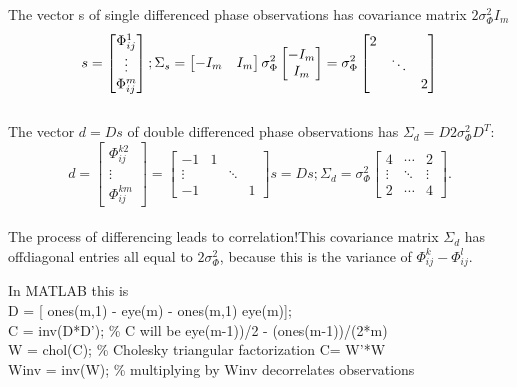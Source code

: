 The vector s of single differenced phase observations has covariance matrix $2\sigma_{\Phi}^{2}I_{m}$
\begin{equation}
s=\begin{bmatrix}
\Phi_{ij}^{1}\\
\vdots\\
\Phi_{ij}^{m}
\end{bmatrix};
\Sigma_{s}=
\begin{bmatrix}
-I_{m}&I_{m}
\end{bmatrix}
\sigma_{\Phi}^{2}
\begin{bmatrix}
-I_{m}\\
I_{m}
\end{bmatrix}
=\sigma_{\Phi}^{2}
\begin{bmatrix}
2\\
&\ddots\\
\multicolumn{2}{c}{\raisebox{1.3ex}[0pt]{\Huge}}&2
\end{bmatrix}
\end{equation}\\
The vector $ d = Ds$ of double differenced phase observations has $\Sigma_{d}=D2\sigma_{\Phi}^{2}D^{T}$:
\begin{equation}
d=\begin{bmatrix}
\Phi_{ij}^{k2}\\
\vdots\\
\Phi_{ij}^{km}
\end{bmatrix}
=\begin{bmatrix}
-1&1\\
\vdots& & \ddots\\
-1&&&1
\end{bmatrix}s
=Ds;
\Sigma_{d}=\sigma_{\Phi}^{2}
\begin{bmatrix}
4&\cdots&2\\
\vdots&\ddots&\vdots\\
2&\cdots&4
\end{bmatrix}.
\end{equation}\\
The process of differencing leads to correlation!This covariance matrix $\Sigma_{d}$ has offdiagonal entries all equal to $2\sigma_{\Phi}^{2}$, because this is the variance of $\Phi_{ij}^{k}-\Phi_{ij}^{l}$.

In MATLAB this is\\
D = [ ones(m,1) - eye(m) - ones(m,1) eye(m)];\\
C = inv(D*D'); \% C will be eye(m-1))/2 - (ones(m-1))/(2*m)\\
W = chol(C); \% Cholesky triangular factorization C= W'*W\\
Winv = inv(W); \% multiplying by Winv decorrelates observations

